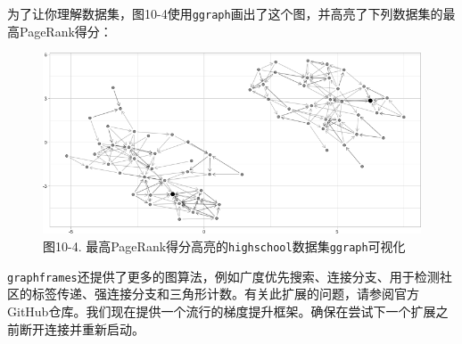 \documentclass[
]{article}
\newenvironment{Shaded}{\begin{snugshade}}{\end{snugshade}}
\newcommand{\DataTypeTok}[1]{\textcolor[rgb]{0.13,0.29,0.53}{#1}}
\newcommand{\DecValTok}[1]{\textcolor[rgb]{0.00,0.00,0.81}{#1}}
\newcommand{\FloatTok}[1]{\textcolor[rgb]{0.00,0.00,0.81}{#1}}
\newcommand{\KeywordTok}[1]{\textcolor[rgb]{0.13,0.29,0.53}{\textbf{#1}}}
\newcommand{\NormalTok}[1]{#1}
\newcommand{\OperatorTok}[1]{\textcolor[rgb]{0.81,0.36,0.00}{\textbf{#1}}}
\newcommand{\OtherTok}[1]{\textcolor[rgb]{0.56,0.35,0.01}{#1}}
\newcommand{\StringTok}[1]{\textcolor[rgb]{0.31,0.60,0.02}{#1}}
\begin{document}
为了让你理解数据集，图10-4使用\texttt{ggraph}画出了这个图，并高亮了下列数据集的最高PageRank得分：

\begin{Shaded}
\end{Shaded}

\begin{figure}
\centering
\includegraphics{figures/10_4.png}
\caption{图10-4.
最高PageRank得分高亮的\texttt{highschool}数据集\texttt{ggraph}可视化}
\end{figure}

\texttt{graphframes}还提供了更多的图算法，例如广度优先搜索、连接分支、用于检测社区的标签传递、强连接分支和三角形计数。有关此扩展的问题，请参阅官方GitHub仓库。我们现在提供一个流行的梯度提升框架。确保在尝试下一个扩展之前断开连接并重新启动。
\end{document}

